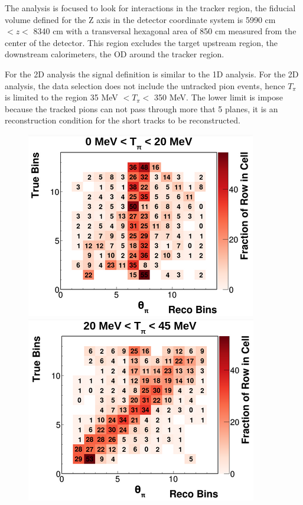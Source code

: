 The analysis is focused to look for interactions in the tracker region, the fiducial volume defined for the Z axis in the detector coordinate system is 5990 cm $< z <$ 8340 cm with a transversal hexagonal area of 850 cm measured from the center of the detector. This region excludes the target upstream region, the downstream calorimeters, the OD around the tracker region. 

For the 2D analysis the signal definition is similar to the 1D analysis. For the 2D analysis, the data selection does not include the untracked pion events, hence $T_\pi$ is limited to the region 35 MeV $<T_\pi<$ 350 MeV. The lower limit is impose because the tracked pions can not pass through more that 5 planes, it is an reconstruction condition for the short tracks to be reconstructed. 


\begin{figure}[!htb]
    \centering
    \includegraphics[scale=0.33]{Figures/Chapter4/SignalDefinition/thetapi0to20tpi.png}
    \includegraphics[scale=0.33]{Figures/Chapter4/SignalDefinition/thetapi20to45tpi.png}

\end{figure}
